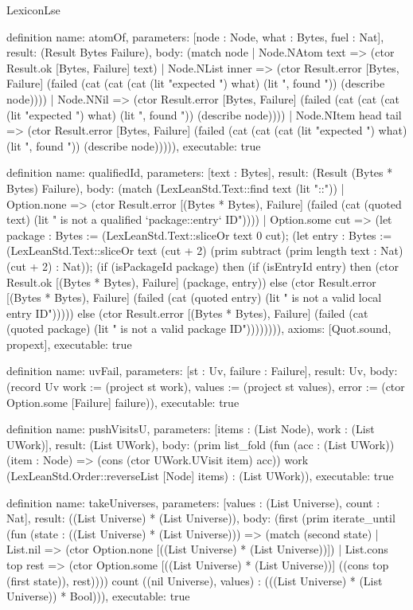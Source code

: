 \begin{lexlean}{LexiconLse}
\begin{semanticmodule}
definition{
  name: atomOf,
  parameters: [node : Node, what : Bytes, fuel : Nat],
  result: (Result Bytes Failure),
  body: (match node
    | Node.NAtom text => (ctor Result.ok [Bytes, Failure] text)
    | Node.NList inner => (ctor Result.error [Bytes, Failure] (failed (cat (cat (cat (lit "expected ") what) (lit ", found ")) (describe node))))
    | Node.NNil => (ctor Result.error [Bytes, Failure] (failed (cat (cat (cat (lit "expected ") what) (lit ", found ")) (describe node))))
    | Node.NItem head tail => (ctor Result.error [Bytes, Failure] (failed (cat (cat (cat (lit "expected ") what) (lit ", found ")) (describe node))))),
  executable: true
}

definition{
  name: qualifiedId,
  parameters: [text : Bytes],
  result: (Result (Bytes * Bytes) Failure),
  body: (match (LexLeanStd.Text::find text (lit "::"))
    | Option.none => (ctor Result.error [(Bytes * Bytes), Failure] (failed (cat (quoted text) (lit " is not a qualified `package::entry` ID"))))
    | Option.some cut => (let package : Bytes := (LexLeanStd.Text::sliceOr text 0 cut); (let entry : Bytes := (LexLeanStd.Text::sliceOr text (cut + 2) (prim subtract (prim length text : Nat) (cut + 2) : Nat)); (if (isPackageId package) then (if (isEntryId entry) then (ctor Result.ok [(Bytes * Bytes), Failure] (package, entry)) else (ctor Result.error [(Bytes * Bytes), Failure] (failed (cat (quoted entry) (lit " is not a valid local entry ID"))))) else (ctor Result.error [(Bytes * Bytes), Failure] (failed (cat (quoted package) (lit " is not a valid package ID")))))))),
  axioms: [Quot.sound, propext],
  executable: true
}

definition{
  name: uvFail,
  parameters: [st : Uv, failure : Failure],
  result: Uv,
  body: (record Uv {work := (project st work), values := (project st values), error := (ctor Option.some [Failure] failure)}),
  executable: true
}

definition{
  name: pushVisitsU,
  parameters: [items : (List Node), work : (List UWork)],
  result: (List UWork),
  body: (prim list_fold (fun (acc : (List UWork)) (item : Node) => (cons (ctor UWork.UVisit item) acc)) work (LexLeanStd.Order::reverseList [Node] items) : (List UWork)),
  executable: true
}

definition{
  name: takeUniverses,
  parameters: [values : (List Universe), count : Nat],
  result: ((List Universe) * (List Universe)),
  body: (first (prim iterate_until (fun (state : ((List Universe) * (List Universe))) => (match (second state)
    | List.nil => (ctor Option.none [((List Universe) * (List Universe))])
    | List.cons top rest => (ctor Option.some [((List Universe) * (List Universe))] ((cons top (first state)), rest)))) count ((nil Universe), values) : (((List Universe) * (List Universe)) * Bool))),
  executable: true
}


\end{semanticmodule}
\end{lexlean}
